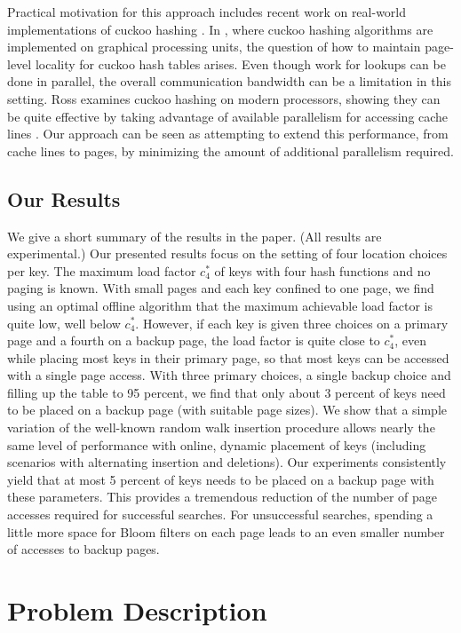 \let\accentvec\vec \documentclass{llncs}
\begin{document}
Practical motivation for this approach includes recent work on
real-world implementations of cuckoo hashing \cite{alcantara2009real,ross2007efficient}.
In \cite{alcantara2009real}, where cuckoo
hashing algorithms are implemented on graphical processing units, the
question of how to maintain page-level locality for cuckoo hash tables
arises.  Even though work for lookups can be done in parallel, the
overall communication bandwidth can be a limitation in this setting.
Ross examines cuckoo hashing on modern processors, showing they
can be quite effective by taking advantage of available parallelism
for accessing cache lines \cite{ross2007efficient}.  Our approach 
can be seen as attempting to extend this performance, from cache lines
to pages, by minimizing the amount of additional parallelism required.
\subsection{Our Results}
We give a short summary of the results in the paper. (All results are
experimental.)  Our presented results focus on the setting of four
location choices per key.  The maximum load factor $c^*_4$ of keys
with four hash functions and no paging is known.  With small pages and
each key confined to one page, we find using an optimal offline
algorithm that the maximum achievable load factor is quite low, well
below $c^*_4$.  However, if each key is given three choices on a
primary page and a fourth on a backup page, the load factor is quite
close to $c^*_4$, even while
placing most keys in their primary page, so that most keys can be
accessed with a single page access.  With three primary choices, a
single backup choice and filling up the table to 95 percent,
we find that only about 3 percent of keys need
to be placed on a backup page (with suitable page sizes).  We show
that a simple variation of the well-known random walk insertion
procedure allows nearly the same level of performance with online,
dynamic placement of keys (including scenarios with alternating insertion and deletions).
Our experiments consistently yield that at
most 5 percent of keys needs to be placed on a backup page with these
parameters. This provides a tremendous reduction of the number of
page accesses required for successful searches. 
For unsuccessful searches, spending a little more space for
Bloom filters on each page leads to an even smaller number of accesses to backup pages.

\section{Problem Description}
\end{document}
